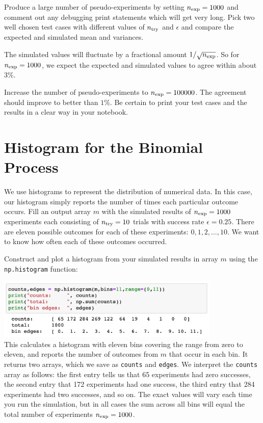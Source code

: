\begin{plot}
Produce a large number of pseudo-experiments by setting $n_{\rm exp} =
1000$ and comment out any debugging print statements which will get
very long.  Pick two  well chosen test cases with different values of
$n_{\rm try}$ and $\epsilon$ and compare the expected and simulated
mean and variances. 
\end{plot}

The simulated values will fluctuate by a fractional amount
$1/\sqrt{n_{\rm exp}}$.  So for $n_{\rm exp} = 1000$, we expect the
expected and simulated values to agree within about $3\%$.

\begin{plot}
Increase the number of pseudo-experiments to $n_{\rm exp} = 100000$.
The agreement should improve to better than $1\%$.  Be certain to
print your test cases and the results in a clear way in your notebook.
\end{plot}

\section{Histogram for the Binomial Process}

We use histograms to represent the distribution of numerical data.  In
this case, our histogram simply reports the number of times each particular outcome
occurs.  Fill an output array $m$ with the simulated results of $n_{\rm exp} =
1000$ experiments each consisting of $n_{\rm try}=10$ trials with
success rate $\epsilon=0.25$.  There are eleven possible outcomes for
each of these experiments: $0,1,2,\ldots,10$.  We want to know how
often each of these outcomes occurred.

\begin{plot} Construct and plot a histogram from your simulated results in array $m$ using the 
{\tt np.histogram} function: \end{plot}
\includegraphics[width=0.8\textwidth]{figs/labs/distributions/makehist.png}\\ 
This calculates a histogram with eleven bins covering the range
from zero to eleven, and reports the number of outcomes from $m$ that
occur in each bin.  It returns two arrays, which we save as 
{\tt counts} and {\tt edges}.  We interpret the {\tt counts} array as
follows: the first entry tells us that 65 experiments had zero
successes, the second entry that 172 experiments had one success, the
third entry that 284 experiments had two successes, and so on.  The
exact values will vary each time you run the simulation, but in all
cases the sum across all bins will equal the total number of
experiments $n_{\rm exp} = 1000$.

